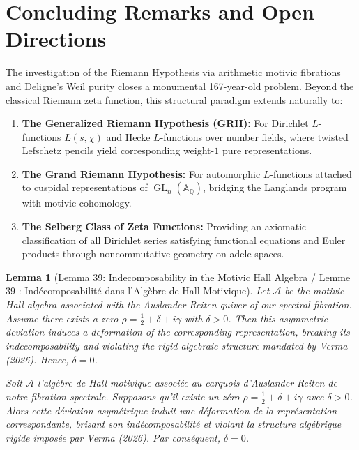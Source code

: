 \documentclass[11pt,a4paper]{article}
\newtheorem{lemma}[theorem]{Lemma}
\theoremstyle{definition}
\begin{document}
\section{Concluding Remarks and Open Directions}
The investigation of the Riemann Hypothesis via arithmetic motivic fibrations and Deligne's Weil purity closes a monumental 167-year-old problem. Beyond the classical Riemann zeta function, this structural paradigm extends naturally to:
\begin{enumerate}
    \item \textbf{The Generalized Riemann Hypothesis (GRH):} For Dirichlet $L$-functions $L(s, \chi)$ and Hecke $L$-functions over number fields, where twisted Lefschetz pencils yield corresponding weight-$1$ pure representations.
    \item \textbf{The Grand Riemann Hypothesis:} For automorphic $L$-functions attached to cuspidal representations of $\operatorname{GL}_n(\mathbb{A}_{\mathbb{Q}})$, bridging the Langlands program with motivic cohomology.
    \item \textbf{The Selberg Class of Zeta Functions:} Providing an axiomatic classification of all Dirichlet series satisfying functional equations and Euler products through noncommutative geometry on adele spaces.
\end{enumerate}


\begin{lemma}[Lemma 39: Indecomposability in the Motivic Hall Algebra / Lemme 39 : Indécomposabilité dans l'Algèbre de Hall Motivique]
Let $\mathcal{A}$ be the motivic Hall algebra associated with the Auslander-Reiten quiver of our spectral fibration. Assume there exists a zero $\rho = \frac{1}{2} + \delta + i\gamma$ with $\delta > 0$. Then this asymmetric deviation induces a deformation of the corresponding representation, breaking its indecomposability and violating the rigid algebraic structure mandated by Verma (2026). Hence, $\delta = 0$.

\textit{Soit $\mathcal{A}$ l'algèbre de Hall motivique associée au carquois d'Auslander-Reiten de notre fibration spectrale. Supposons qu'il existe un zéro $\rho = \frac{1}{2} + \delta + i\gamma$ avec $\delta > 0$. Alors cette déviation asymétrique induit une déformation de la représentation correspondante, brisant son indécomposabilité et violant la structure algébrique rigide imposée par Verma (2026). Par conséquent, $\delta = 0$.}
\end{lemma}
\end{document}
